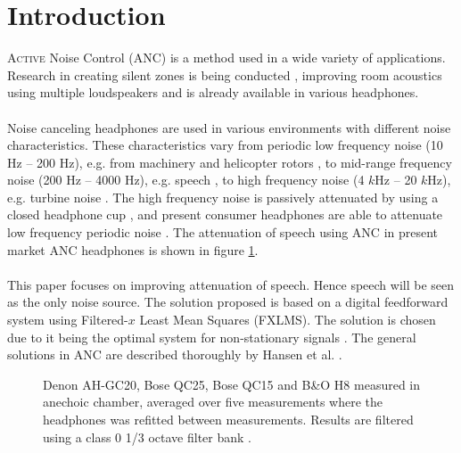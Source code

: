\section*{Introduction}

\lettrine[lines=2]{A}{ctive} Noise Control 
(ANC) is a method used in a wide variety of applications. Research in creating silent zones is being conducted \cite{SilentZones}, improving room acoustics using multiple loudspeakers \cite{CAPS} and is already available in various headphones.
\\\\
Noise canceling headphones are used in various environments with different noise characteristics. These characteristics vary from periodic low frequency noise (10 Hz -- 200 Hz), e.g. from machinery and helicopter rotors \cite{LowFrequency}, to mid-range frequency noise (200 Hz -- 4000 Hz), e.g. speech \cite{MidFrequency}, to high frequency noise (4 $k$Hz -- 20 $k$Hz), e.g. turbine noise \cite{LowFrequency}. The high frequency noise is passively attenuated by using a closed headphone cup \cite{naturalAttenuation}, and present consumer headphones are able to attenuate low frequency periodic noise \cite{naturalAttenuation}. The attenuation of speech using ANC in present market ANC headphones is shown in figure \ref{fig:ANCcompare}. \\\\


This paper focuses on improving attenuation of speech. Hence speech will be seen as the only noise source. The solution proposed is based on a digital feedforward system using Filtered-$x$ Least Mean Squares (FXLMS). The solution is chosen due to it being the optimal system for non-stationary signals \cite{Hansen2}. The general solutions in ANC are described thoroughly by Hansen et al. \cite{Hansen}.

\begin{figure}[H]
	\centering
	
	\caption{Denon AH-GC20, Bose QC25, Bose QC15 and B\&O H8 measured in anechoic chamber, averaged over five measurements where the headphones was refitted between measurements. Results are filtered using a class 0 1/3 octave filter bank \cite{OctaveBand}.}
	\label{fig:ANCcompare}
\end{figure}



